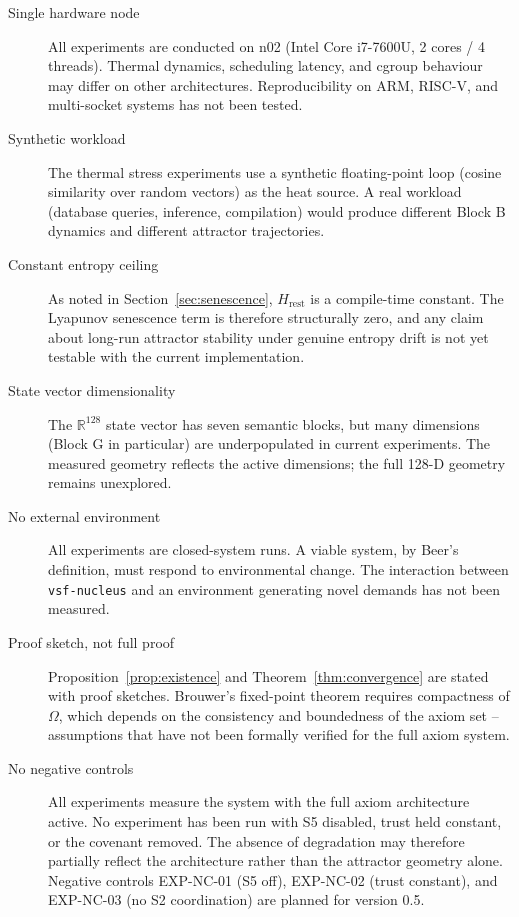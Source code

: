 \documentclass[11pt, a4paper]{article}
\newcommand{\R}{\mathbb{R}}
\newcommand{\nucleus}{\texttt{vsf-nucleus}}
\begin{document}
\begin{description}

  \item[Single hardware node]
    All experiments are conducted on n02 (Intel Core i7-7600U, 2 cores / 4 threads).
    Thermal dynamics, scheduling latency, and cgroup behaviour may differ
    on other architectures.
    Reproducibility on ARM, RISC-V, and multi-socket systems has not been tested.

  \item[Synthetic workload]
    The thermal stress experiments use a synthetic floating-point loop
    (cosine similarity over random vectors) as the heat source.
    A real workload (database queries, inference, compilation) would
    produce different Block B dynamics and different attractor trajectories.

  \item[Constant entropy ceiling]
    As noted in Section~\ref{sec:senescence}, $H_\text{rest}$ is a
    compile-time constant.
    The Lyapunov senescence term is therefore structurally zero, and any
    claim about long-run attractor stability under genuine entropy drift
    is not yet testable with the current implementation.

  \item[State vector dimensionality]
    The $\R^{128}$ state vector has seven semantic blocks, but many
    dimensions (Block G in particular) are underpopulated in current
    experiments.
    The measured geometry reflects the active dimensions; the full 128-D
    geometry remains unexplored.

  \item[No external environment]
    All experiments are closed-system runs.
    A viable system, by Beer's definition, must respond to environmental
    change.
    The interaction between \nucleus{} and an environment generating
    novel demands has not been measured.

  \item[Proof sketch, not full proof]
    Proposition~\ref{prop:existence} and Theorem~\ref{thm:convergence}
    are stated with proof sketches.
    Brouwer's fixed-point theorem requires compactness of $\Omega$, which
    depends on the consistency and boundedness of the axiom set -- assumptions
    that have not been formally verified for the full axiom system.

  \item[No negative controls]
    All experiments measure the system with the full axiom architecture active.
    No experiment has been run with S5 disabled, trust held constant, or the
    covenant removed.
    The absence of degradation may therefore partially reflect the architecture
    rather than the attractor geometry alone.
    Negative controls EXP-NC-01 (S5 off), EXP-NC-02 (trust constant), and
    EXP-NC-03 (no S2 coordination) are planned for version 0.5.


\end{description}
\end{document}
